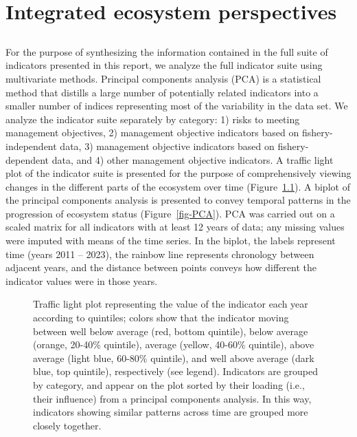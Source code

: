 \documentclass[
  letterpaper,
  oneside,
  open=any]{scrbook}
\begin{document}

\chapter{Integrated ecosystem
perspectives}\label{integrated-ecosystem-perspectives}

\section*{}\label{section}

\markright{}

For the purpose of synthesizing the information contained in the full
suite of indicators presented in this report, we analyze the full
indicator suite using multivariate methods. Principal components
analysis (PCA) is a statistical method that distills a large number of
potentially related indicators into a smaller number of indices
representing most of the variability in the data set. We analyze the
indicator suite separately by category: 1) risks to meeting management
objectives, 2) management objective indicators based on
fishery-independent data, 3) management objective indicators based on
fishery-dependent data, and 4) other management objective indicators. A
traffic light plot of the indicator suite is presented for the purpose
of comprehensively viewing changes in the different parts of the
ecosystem over time (Figure~\ref{fig-traffic}). A biplot of the
principal components analysis is presented to convey temporal patterns
in the progression of ecosystem status (Figure~\ref{fig-PCA}). PCA was
carried out on a scaled matrix for all indicators with at least 12 years
of data; any missing values were imputed with means of the time series.
In the biplot, the labels represent time (years 2011 -- 2023), the
rainbow line represents chronology between adjacent years, and the
distance between points conveys how different the indicator values were
in those years.

\begin{figure}


\caption{\label{fig-traffic}Traffic light plot representing the value of
the indicator each year according to quintiles; colors show that the
indicator moving between well below average (red, bottom quintile),
below average (orange, 20-40\% quintile), average (yellow, 40-60\%
quintile), above average (light blue, 60-80\% quintile), and well above
average (dark blue, top quintile), respectively (see legend). Indicators
are grouped by category, and appear on the plot sorted by their loading
(i.e., their influence) from a principal components analysis. In this
way, indicators showing similar patterns across time are grouped more
closely together.}

\end{figure}%
\end{document}
